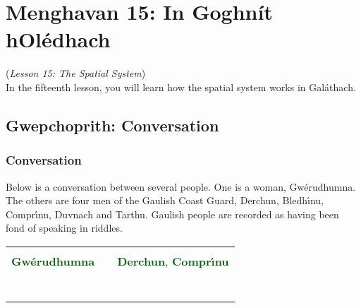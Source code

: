 \section{Menghavan 15: In Goghn\'{i}t hOl\'{e}dhach}
(\textit{Lesson 15: The Spatial System})\\

In the fifteenth lesson, you will learn how the spatial system works in Gal\'{a}thach.

\subsection{Gwepchoprith: Conversation}

\subsubsection{Conversation}

Below is a conversation between several people. One is a woman, Gw\'{e}rudhumna. The others are four men of the Gaulish Coast Guard, Derchun, Bledh\'{\i}nu, Compr\'{\i}nu, Duvnach and Tarthu. Gaulish people are recorded as having been fond of speaking in riddles.


\begin{table}[H]
\centering
    \begin{tabular}{M{3.0cm}M{10.0cm}M{3.0cm}}
     &  & \\
	    \textcolor{darkgreen}{\textbf{Gw\'{e}rudhumna}} &  & \textcolor{darkgreen}{\textbf{Derchun}, \textbf{Compr\'{\i}nu}}\\
     &  & \\
     &  & \\
     &  & \\
     &  & \\
     &  & \\
     &  & \\
     &  & 
    \end{tabular}
\end{table}

